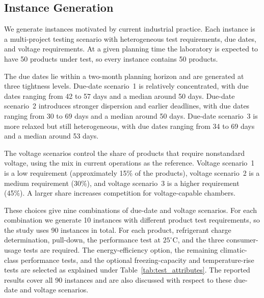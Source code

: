 \subsection{Instance Generation}
\label{subsec:exp_design}
\label{subsec:experimental_design}

We generate instances motivated by current industrial practice. Each instance is a multi-project testing scenario with heterogeneous test requirements, due dates, and voltage requirements. At a given planning time the laboratory is expected to have 50 products under test, so every instance contains 50 products.

The due dates lie within a two-month planning horizon and are generated at three tightness levels. Due-date scenario~1 is relatively concentrated, with due dates ranging from 42 to 57 days and a median around 50 days. Due-date scenario~2 introduces stronger dispersion and earlier deadlines, with due dates ranging from 30 to 69 days and a median around 50 days. Due-date scenario~3 is more relaxed but still heterogeneous, with due dates ranging from 34 to 69 days and a median around 53 days.

The voltage scenarios control the share of products that require nonstandard voltage, using the mix in current operations as the reference. Voltage scenario~1 is a low requirement (approximately 15\% of the products), voltage scenario~2 is a medium requirement (30\%), and voltage scenario~3 is a higher requirement (45\%). A larger share increases competition for voltage-capable chambers.

These choices give nine combinations of due-date and voltage scenarios. For each combination we generate 10 instances with different product test requirements, so the study uses 90 instances in total. For each product, refrigerant charge determination, pull-down, the performance test at \(25^\circ\mathrm{C}\), and the three consumer-usage tests are required. The energy-efficiency option, the remaining climatic-class performance tests, and the optional freezing-capacity and temperature-rise tests are selected as explained under Table~\ref{tab:test_attributes}. The reported results cover all 90 instances and are also discussed with respect to these due-date and voltage scenarios.
